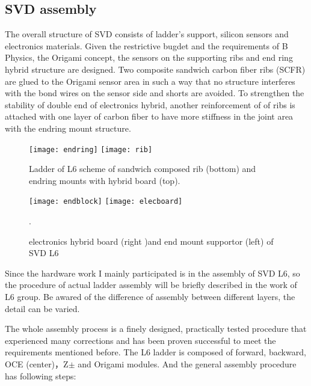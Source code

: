 \subsection{SVD assembly}
The overall structure of SVD consists of ladder's support, silicon sensors and electronics materials. Given the restrictive bugdet and the requirements of B Physics, the Origami concept, the sensors on the supporting ribs and end ring hybrid structure are designed. Two composite sandwich carbon fiber ribs (SCFR) are glued to the Origami sensor area in such a way that no structure interferes with the bond wires on the sensor side and shorts are avoided. To strengthen the stability of double end of electronics hybrid, another reinforcement of of ribs is attached with one layer of carbon fiber to have more stiffness in the joint area with the endring mount structure.

\begin{figure}[htbp]
	\centering
	\texttt{[image: endring]}
	\texttt{[image: rib]}
	\caption{Ladder of L6 scheme of sandwich composed rib (bottom) and endring mounts with hybrid board (top).}
\end{figure}

\begin{figure}[htbp]
	\centering
	\texttt{[image: endblock]}
	\texttt{[image: elecboard]}
	\caption{electronics hybrid board (right )and end mount supportor (left) of SVD L6}. 
\end{figure}

Since the hardware work I mainly participated is in the assembly of SVD L6, so the procedure of actual ladder assembly will be briefly described in the work of L6 group. Be awared of the difference of assembly between different layers, the detail can be varied. 

The whole assembly process is a finely designed, practically tested procedure that experienced many corrections and has been proven successful to meet the requirements mentioned before. The L6 ladder is composed of forward, backward, OCE (center)，Z$\pm$ and Origami modules. And the general assembly procedure has following steps:

